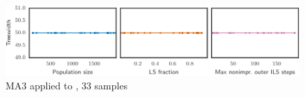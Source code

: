 \begin{figure}[h]\strictpagecheck\centering

\includegraphics[scale=0.85]{plots/MA3-correlation-regplots-mulsol-i-1-0-crop.pdf}


\caption[Parameter influence for MA3 when applied to ]{\gls{MA3} applied to , 33 samples}

\label{MA3-correlation-regplots-mulsol-i-1}

\end{figure}